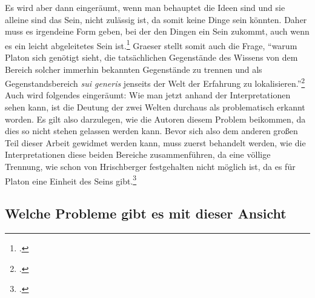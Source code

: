 Es wird aber dann eingeräumt, wenn man behauptet die Ideen sind und sie alleine sind das Sein, nicht zulässig ist, da somit keine Dinge sein könnten. Daher muss es irgendeine Form geben, bei der den Dingen ein Sein zukommt, auch wenn es ein leicht abgeleitetes Sein ist.\footcite[vgl.][S. 131]{Martin73}
Graeser stellt somit auch die Frage, \enquote{warum Platon sich genötigt sieht, die tatsächlichen Gegenstände des Wissens von dem Bereich solcher immerhin bekannten Gegenstände zu trennen und als Gegenstandsbereich \emph{sui generis} jenseits der Welt der Erfahrung zu lokalisieren.}\footcite[][S. 135]{GraeserPhiloGeschichte}
Auch wird folgendes eingeräumt: 
Wie man jetzt anhand der Interpretationen sehen kann, ist die Deutung der zwei Welten durchaus als problematisch erkannt worden. Es gilt also darzulegen, wie die Autoren diesem Problem beikommen, da dies so nicht stehen gelassen werden kann. 
Bevor sich also dem anderen großen Teil dieser Arbeit gewidmet werden kann, muss zuerst behandelt werden, wie die Interpretationen diese beiden Bereiche zusammenführen, da eine völlige Trennung, wie schon von Hrischberger festgehalten nicht möglich ist, da es für Platon eine Einheit des Seins gibt.\footcite[vgl][S. 100]{Hirschberger}

\subsection{Welche Probleme gibt es mit dieser Ansicht}
